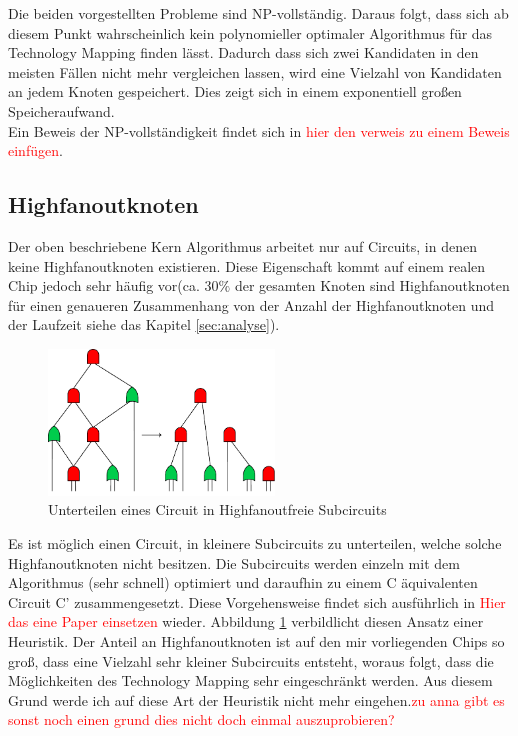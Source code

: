 \documentclass[11pt, a4paper, german]{article}
\newcommand{\TM}{Technology Mapping }
\begin{document}
Die beiden vorgestellten Probleme sind NP-vollständig. Daraus folgt, dass sich ab diesem Punkt wahrscheinlich  kein polynomieller optimaler Algorithmus für das \TM finden lässt. Dadurch dass sich zwei Kandidaten in den meisten Fällen nicht mehr vergleichen lassen, wird eine Vielzahl von Kandidaten an jedem Knoten gespeichert. Dies zeigt sich in einem exponentiell großen Speicheraufwand. \\
Ein Beweis der NP-vollständigkeit findet sich in \textcolor{red}{hier den verweis zu einem Beweis einfügen}.

\subsection{Highfanoutknoten}
\label{subsec:highfanout}
Der oben beschriebene Kern Algorithmus arbeitet nur auf Circuits, in denen keine Highfanoutknoten existieren. Diese Eigenschaft kommt auf einem realen Chip jedoch sehr häufig vor(ca. $30\%$ der gesamten Knoten sind Highfanoutknoten für einen genaueren Zusammenhang von der Anzahl der Highfanoutknoten und der Laufzeit siehe das Kapitel \ref{sec:analyse}).\\
 \begin{figure}
		\includegraphics[width = 6cm]{pictures/compiled/ohne_highfanout_heu}
		\caption{Unterteilen eines Circuit in Highfanoutfreie Subcircuits}
		\label{bild:ohne_highfanout_heu}
\end{figure}
 Es ist möglich einen Circuit, in kleinere Subcircuits zu unterteilen, welche solche Highfanoutknoten nicht besitzen. Die Subcircuits werden einzeln mit dem Algorithmus (sehr schnell) optimiert und daraufhin zu einem C äquivalenten Circuit C' zusammengesetzt. Diese Vorgehensweise findet sich ausführlich in \textcolor{red}{Hier das eine Paper einsetzen} wieder. Abbildung \ref{bild:ohne_highfanout_heu} verbildlicht diesen Ansatz einer Heuristik. 
  Der Anteil an Highfanoutknoten ist auf den mir vorliegenden Chips so groß, dass eine Vielzahl sehr kleiner Subcircuits entsteht, woraus folgt, dass die Möglichkeiten des \TM sehr eingeschränkt werden. Aus diesem Grund werde ich auf diese Art der   Heuristik nicht mehr eingehen.\textcolor{red}{zu anna gibt es sonst noch einen grund dies nicht doch einmal auszuprobieren?}\\
\end{document}
